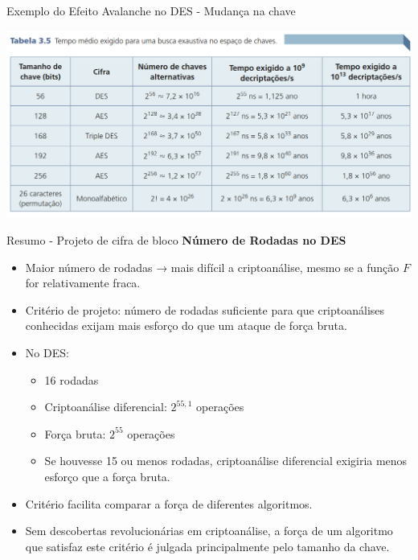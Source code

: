 \begin{frame}{Exemplo do Efeito Avalanche no DES - Mudança na chave}


\centering
    \includegraphics[width=0.9\linewidth]{Figuras/tempo-para-quebrar.png}
    
\end{frame}

\begin{frame}{Resumo - Projeto de cifra de bloco}
\textbf{Número de Rodadas no DES}
    \begin{itemize}
        \item Maior número de rodadas → mais difícil a criptoanálise, mesmo se a função $F$ for relativamente fraca.
        \item Critério de projeto: número de rodadas suficiente para que criptoanálises conhecidas exijam mais esforço do que um ataque de força bruta.
        \item No DES:
        \begin{itemize}
            \item 16 rodadas
            \item Criptoanálise diferencial: $2^{55,1}$ operações
            \item Força bruta: $2^{55}$ operações
            \item Se houvesse 15 ou menos rodadas, criptoanálise diferencial exigiria menos esforço que a força bruta.
        \end{itemize}
        \item Critério facilita comparar a força de diferentes algoritmos.
        \item Sem descobertas revolucionárias em criptoanálise, a força de um algoritmo que satisfaz este critério é julgada principalmente pelo tamanho da chave.
    \end{itemize}


    
\end{frame}

